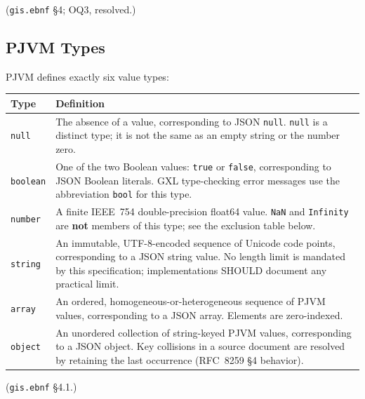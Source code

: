 (\texttt{gis.ebnf} \S4; OQ3, resolved.)

\subsection{PJVM Types}
\label{subsec:gis:pjvm-types}

PJVM defines exactly six value types:

\begin{center}
\begin{tabular}{lp{9.5cm}}
\hline
\textbf{Type} & \textbf{Definition} \\
\hline
\texttt{null}    & The absence of a value, corresponding to JSON \texttt{null}.
                   \texttt{null} is a distinct type; it is not the same as
                   an empty string or the number zero. \\
\texttt{boolean} & One of the two Boolean values: \texttt{true} or
                   \texttt{false}, corresponding to JSON Boolean literals.
                   GXL type-checking error messages use the abbreviation
                   \texttt{bool} for this type. \\
\texttt{number}  & A finite IEEE~754 double-precision float64 value.
                   \texttt{NaN} and \texttt{Infinity} are \textbf{not}
                   members of this type; see the exclusion table below. \\
\texttt{string}  & An immutable, UTF-8-encoded sequence of Unicode code
                   points, corresponding to a JSON string value.
                   No length limit is mandated by this specification;
                   implementations SHOULD document any practical limit. \\
\texttt{array}   & An ordered, homogeneous-or-heterogeneous sequence of
                   PJVM values, corresponding to a JSON array.
                   Elements are zero-indexed. \\
\texttt{object}  & An unordered collection of string-keyed PJVM values,
                   corresponding to a JSON object.
                   Key collisions in a source document are resolved by
                   retaining the last occurrence (RFC~8259 \S4 behavior). \\
\hline
\end{tabular}
\end{center}

(\texttt{gis.ebnf} \S4.1.)

